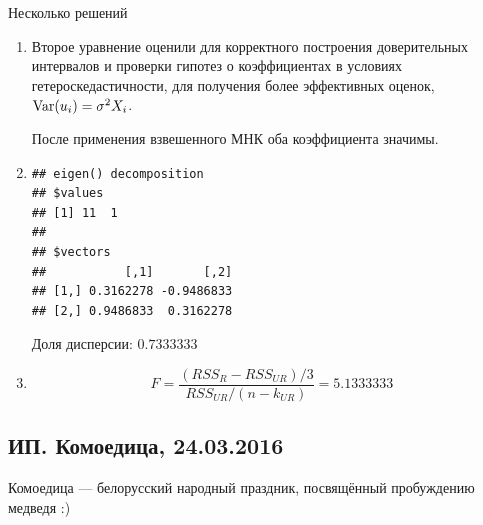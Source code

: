 \documentclass[12pt, a4paper]{article}\usepackage[]{graphicx}\usepackage[]{color}
\makeatletter
\newenvironment{kframe}{%
 \def\at@end@of@kframe{}%
 \ifinner\ifhmode%
  \def\at@end@of@kframe{\end{minipage}}%
  \begin{minipage}{\columnwidth}%
 \fi\fi%
 \def\FrameCommand##1{\hskip\@totalleftmargin \hskip-\fboxsep
 \colorbox{shadecolor}{##1}\hskip-\fboxsep
     \hskip-\linewidth \hskip-\@totalleftmargin \hskip\columnwidth}%
 \MakeFramed {\advance\hsize-\width
   \@totalleftmargin\z@ \linewidth\hsize
   \@setminipage}}%
 {\par\unskip\endMakeFramed%
 \at@end@of@kframe}
\newenvironment{knitrout}{}{} %
\makeatother
\begin{document}
Несколько решений
\begin{enumerate}
  \item Второе уравнение оценили для корректного построения доверительных интервалов и проверки гипотез о коэффициентах в условиях гетероскедастичности, для получения более эффективных оценок, $\operatorname{Var}(u_i)=\sigma^2 X_i$.

  После применения взвешенного МНК оба коэффициента значимы.
  \item
\begin{knitrout}
\color{fgcolor}\begin{kframe}
\begin{verbatim}
## eigen() decomposition
## $values
## [1] 11  1
## 
## $vectors
##           [,1]       [,2]
## [1,] 0.3162278 -0.9486833
## [2,] 0.9486833  0.3162278
\end{verbatim}
\end{kframe}
\end{knitrout}

Доля дисперсии: $0.7333333$

  \item
  \[
  F = \frac{(RSS_R - RSS_{UR})/3}{RSS_{UR}/(n-k_{UR})}=
  5.1333333
  \]

\end{enumerate}



\subsection{ИП. Комоедица, 24.03.2016}


Комоедица — белорусский народный праздник, посвящённый пробуждению медведя :)
\end{document}
